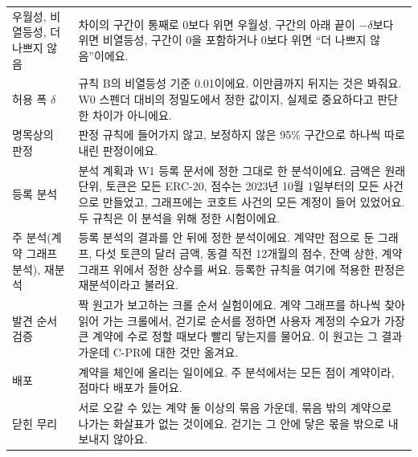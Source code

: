 \documentclass[11pt]{article}
\begin{document}
{\begin{longtable}{@{}L{3.6cm}L{\dimexpr\linewidth-3.6cm-2\tabcolsep\relax}@{}}
우월성, 비열등성, 더 나쁘지 않음 & 차이의 구간이 통째로 0보다 위면 우월성, 구간의 아래 끝이 $-\delta$보다 위면 비열등성, 구간이 0을 포함하거나 0보다 위면 “더 나쁘지 않음”이에요. \\
허용 폭 $\delta$ & 규칙 B의 비열등성 기준 0.01이에요. 이만큼까지 뒤지는 것은 봐줘요. W0 스펜더 대비의 정밀도에서 정한 값이지, 실제로 중요하다고 판단한 차이가 아니에요. \\
명목상의 판정 & 판정 규칙에 들어가지 않고, 보정하지 않은 95\% 구간으로 하나씩 따로 내린 판정이에요. \\
등록 분석 & 분석 계획과 W1 등록 문서에 정한 그대로 한 분석이에요. 금액은 원래 단위, 토큰은 모든 ERC-20, 점수는 2023년 10월 1일부터의 모든 사건으로 만들었고, 그래프에는 코호트 사건의 모든 계정이 들어 있었어요. 두 규칙은 이 분석을 위해 정한 시험이에요. \\
주 분석(계약 그래프 분석), 재분석 & 등록 분석의 결과를 안 뒤에 정한 분석이에요. 계약만 점으로 둔 그래프, 다섯 토큰의 달러 금액, 동결 직전 12개월의 점수, 잔액 상한, 계약 그래프 위에서 정한 상수를 써요. 등록한 규칙을 여기에 적용한 판정은 재분석이라고 불러요. \\
발견 순서 검증 & 짝 원고가 보고하는 크롤 순서 실험이에요. 계약 그래프를 하나씩 찾아 읽어 가는 크롤에서, 걷기로 순서를 정하면 사용자 계정의 수요가 가장 큰 계약에 수로 정할 때보다 빨리 닿는지를 물어요. 이 원고는 그 결과 가운데 C-PR에 대한 것만 옮겨요. \\
배포 & 계약을 체인에 올리는 일이에요. 주 분석에서는 모든 점이 계약이라, 점마다 배포가 들어요. \\
닫힌 무리 & 서로 오갈 수 있는 계약 둘 이상의 묶음 가운데, 묶음 밖의 계약으로 나가는 화살표가 없는 것이에요. 걷기는 그 안에 닿은 몫을 밖으로 내보내지 않아요. \\
\end{longtable}}
\addtocounter{table}{-1}%











\end{document}
